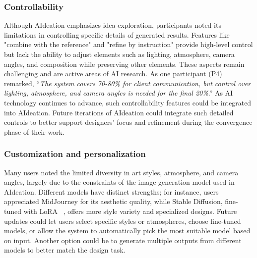 \subsubsection{Controllability}
Although AIdeation emphasizes idea exploration, participants noted its limitations in controlling specific details of generated results. Features like "combine with the reference" and "refine by instruction" provide high-level control but lack the ability to adjust elements such as lighting, atmosphere, camera angles, and composition while preserving other elements. These aspects remain challenging and are active areas of AI research. As one participant (P4) remarked, “\textit{The system covers 70-80\% for client communication, but control over lighting, atmosphere, and camera angles is needed for the final 20\%}.” As AI technology continues to advance, such controllability features could be integrated into AIdeation. Future iterations of AIdeation could integrate such detailed controls to better support designers' focus and refinement during the convergence phase of their work.

\subsubsection{Customization and personalization}
Many users noted the limited diversity in art styles, atmosphere, and camera angles, largely due to the constraints of the image generation model used in AIdeation. Different models have distinct strengths; for instance, users appreciated MidJourney for its aesthetic quality, while Stable Diffusion, fine-tuned with LoRA ~\cite{hu2021lora}, offers more style variety and specialized designs. Future updates could let users select specific styles or atmospheres, choose fine-tuned models, or allow the system to automatically pick the most suitable model based on input. Another option could be to generate multiple outputs from different models to better match the design task.

